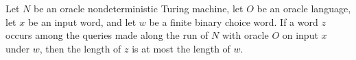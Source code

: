 \begin{theorem}
\label{Turing.OracleNDTM.length_le_of_mem_queriesAlong}
\leanok
{}
Let $N$ be an oracle nondeterministic Turing machine, let $O$ be an oracle language, let
$x$ be an input word, and let $w$ be a finite binary choice word. If a word $z$ occurs
among the queries made along the run of $N$ with oracle $O$ on input $x$ under $w$, then
the length of $z$ is at most the length of $w$.
\end{theorem}
